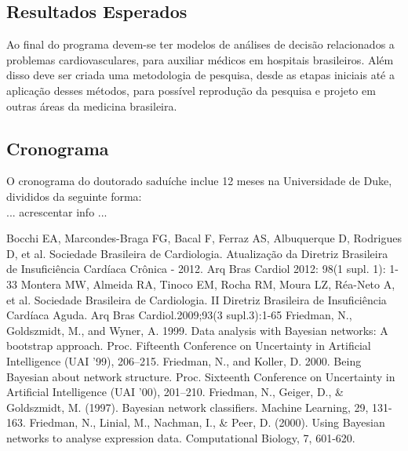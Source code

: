 \documentclass{article}
\begin{document}
\subsection{ \label{sec:resultados} Resultados Esperados}
Ao final do programa devem-se ter modelos de análises de decisão relacionados a problemas cardiovasculares, 
para auxiliar médicos em hospitais brasileiros. Além disso deve ser criada uma metodologia de pesquisa, 
desde as etapas iniciais até a aplicação desses métodos, para possível reprodução da pesquisa e projeto em 
outras áreas da medicina brasileira.

\subsection{ \label{sec:cronograma} Cronograma}
O cronograma do doutorado saduíche inclue 12 meses na Universidade de Duke, divididos da seguinte forma:\\
{\color{red} ... acrescentar info ...}


\clearpage

\begin{thebibliography}{9}
Bocchi EA, Marcondes-Braga FG, Bacal F, Ferraz AS, Albuquerque D, Rodrigues D, et al. Sociedade Brasileira de Cardiologia. Atualização da Diretriz Brasileira de Insuficiência Cardíaca Crônica - 2012. Arq Bras Cardiol 2012: 98(1 supl. 1): 1-33
Montera MW, Almeida RA, Tinoco EM, Rocha RM, Moura LZ, Réa-Neto A, et al.
Sociedade Brasileira de Cardiologia. II Diretriz Brasileira de Insuficiência Cardíaca Aguda.
Arq Bras Cardiol.2009;93(3 supl.3):1-65
Friedman, N., Goldszmidt, M., and Wyner, A. 1999. Data analysis with Bayesian networks: A bootstrap approach.
Proc. Fifteenth Conference on Uncertainty in Artificial Intelligence (UAI ’99), 206–215.
Friedman, N., and Koller, D. 2000. Being Bayesian about network structure. Proc. Sixteenth Conference on Uncertainty in Artificial Intelligence (UAI ’00), 201–210.
Friedman, N., Geiger, D., \& Goldszmidt, M. (1997). Bayesian network classifiers. Machine Learning, 29, 131-163.
Friedman, N., Linial, M., Nachman, I., \& Peer, D. (2000). Using Bayesian networks to analyse expression data. Computational Biology, 7, 601-620.
\end{thebibliography}
\end{document}
